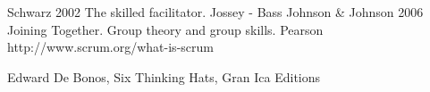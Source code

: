 \begin{thebibliography}{3} %
	Schwarz 2002 The skilled facilitator. Jossey - Bass
	Johnson \& Johnson 2006 Joining Together. Group theory and group skills. Pearson
	http://www.scrum.org/what-is-scrum

	Edward De Bonos, Six Thinking Hats, Gran Ica Editions

\end{thebibliography}